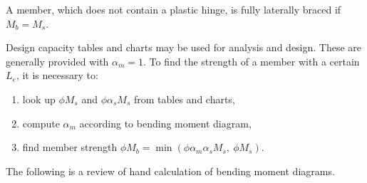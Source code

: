 A member, which does not contain a plastic hinge, is fully laterally braced if $M_b=M_s$.

Design capacity tables and charts may be used for analysis and design. These are generally provided with $\alpha_m=1$. To find the strength of a member with a certain $L_e$, it is necessary to:
\begin{enumerate}
\item look up $\phi{}M_s$ and $\phi{}\alpha_sM_s$ from tables and charts,
\item compute $\alpha_m$ according to bending moment diagram,
\item find member strength $\phi{}M_b=\min\left(\phi\alpha_m\alpha_sM_s,~\phi{}M_s\right)$.
\end{enumerate}

The following is a review of hand calculation of bending moment diagrams.
\begin{figure}[H]\scriptsize
\centering
\end{figure}

